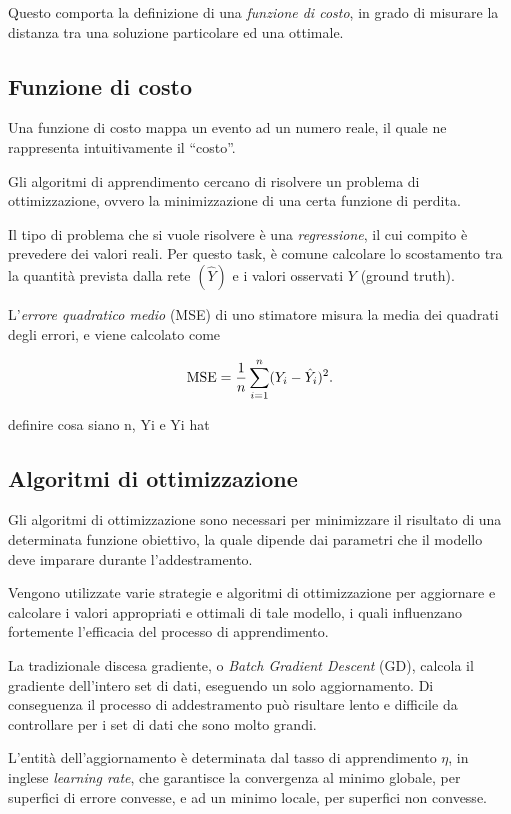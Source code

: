 Questo comporta la definizione di una \emph{funzione di costo}, in grado di misurare la distanza tra una soluzione particolare ed una ottimale. 

\subsection{Funzione di costo}
\label{subsec:loss}

Una funzione di costo mappa un evento ad un numero reale, il quale ne rappresenta intuitivamente il ``costo''.

Gli algoritmi di apprendimento cercano di risolvere un problema di ottimizzazione, ovvero la minimizzazione di una certa funzione di perdita. 

Il tipo di problema che si vuole risolvere è una \emph{regressione}, il cui compito è prevedere dei valori reali. Per questo task, è comune calcolare lo scostamento tra la quantità prevista dalla rete $(\hat{Y})$ e i valori osservati $Y$ (ground truth). 
 
L'\emph{errore quadratico medio} (MSE) di uno stimatore misura la media dei quadrati degli errori, e viene calcolato come

\begin{equation}
\operatorname{MSE} = \frac{1}{n}\sum_{i=1}^{n}(Y_i-\hat{Y}_i)^2 \mbox{.}
\end{equation}

{\color{red} definire cosa siano n, Yi e Yi hat}
\subsection{Algoritmi di ottimizzazione}
\label{subsec:optimizer}

Gli algoritmi di ottimizzazione sono necessari per minimizzare il risultato di una determinata funzione obiettivo, la quale dipende dai parametri che il modello deve imparare durante l'addestramento. 

Vengono utilizzate varie strategie e algoritmi di ottimizzazione per aggiornare e calcolare i valori appropriati e ottimali di tale modello, i quali influenzano fortemente l'efficacia del processo di apprendimento.

La tradizionale discesa gradiente, o \emph{Batch Gradient Descent} (GD), calcola il gradiente dell'intero set di dati, eseguendo un solo aggiornamento. Di conseguenza il processo di addestramento può risultare lento e difficile da controllare per i set di dati che sono molto grandi. 

L'entità dell'aggiornamento è determinata dal tasso di apprendimento $\eta$, in inglese \emph{learning rate}, che garantisce la convergenza al minimo globale, per superfici di errore convesse, e ad un minimo locale, per superfici non convesse. 

